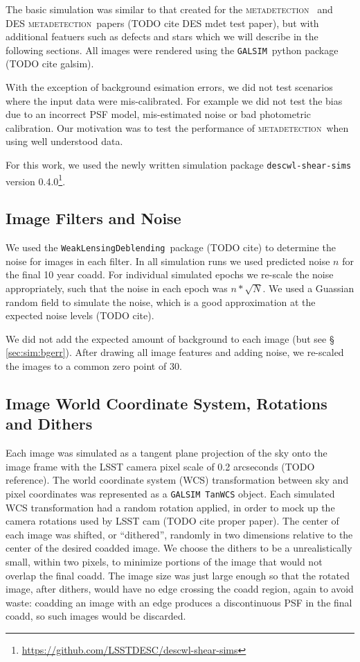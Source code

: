\documentclass[iop, twocolappendix, appendixfloats, numberedappendix, apj]{hackemulateapj}
\newcommand{\descwl}{\texttt{WeakLensingDeblending}}
\newcommand{\galsim}{\texttt{GALSIM}}
\newcommand{\mdet}{\textsc{metadetection}}
\begin{document}
The basic simulation was similar to that created for the \mdet\ \citep{mdet20}
and DES \mdet\ papers (TODO cite DES mdet test paper), but with additional
featuers such as defects and stars which we will describe
in the following sections.  All images were rendered using the
\galsim\ python package (TODO cite galsim).

With the exception of background esimation errors, we did not test scenarios
where the input data were mis-calibrated.  For example we did not test the bias
due to an incorrect PSF model, mis-estimated noise or bad photometric
calibration.  Our motivation was to test the performance of \mdet\ when
using well understood data.

For this work, we used the newly written simulation package
\texttt{descwl-shear-sims} version
0.4.0\footnote{\url{https://github.com/LSSTDESC/descwl-shear-sims}}.

\subsection{Image Filters and Noise} \label{sec:sim:noise}

We used the \descwl\ package (TODO cite) to determine the
noise for images in each filter.  In all simulation runs we used predicted
noise $n$ for the final 10 year coadd.  For individual simulated epochs we
re-scale the noise appropriately, such that the noise in each epoch was $n *
\sqrt{N}$.  We used a Guassian random field to simulate the noise, which is a
good approximation at the expected noise levels (TODO cite).

We did not add the expected amount of background to each image (but see \S
\ref{sec:sim:bgerr}).  After drawing all image features and adding
noise, we re-scaled the images to a common zero point of 30.

\subsection{Image World Coordinate System, Rotations and Dithers} \label{sec:sim:rotdith}

Each image was simulated as a tangent plane projection of the sky onto the
image frame with the LSST camera pixel scale of 0.2 arcseconds (TODO reference).
The world coordinate system (WCS) transformation between sky and pixel
coordinates was represented as a \galsim\ \texttt{TanWCS} object.  Each
simulated WCS transformation had a random rotation applied, in order to mock up
the camera rotations used by LSST cam (TODO cite proper paper).  The center of
each image was shifted, or ``dithered'', randomly in two dimensions relative to
the center of the desired coadded image.  We choose the dithers to be a
unrealistically small, within two pixels, to minimize portions of the image
that would not overlap the final coadd.  The image size was just large enough
so that the rotated image, after dithers, would have no edge crossing the coadd
region, again to avoid waste:  coadding an image with an edge produces a
discontinuous PSF in the final coadd, so such images would be discarded.
\end{document}

